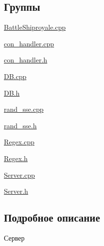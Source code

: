 \subsection*{Группы}
\begin{DoxyCompactItemize}
\item 
\mbox{\hyperlink{group__battleshiproyalecpp}{Battle\+Shiproyale.\+cpp}}
\item 
\mbox{\hyperlink{group__con__handler__cpp}{con\+\_\+handler.\+cpp}}
\item 
\mbox{\hyperlink{group__con__handler__h}{con\+\_\+handler.\+h}}
\item 
\mbox{\hyperlink{group__dbcpp}{D\+B.\+cpp}}
\item 
\mbox{\hyperlink{group__dbh}{D\+B.\+h}}
\item 
\mbox{\hyperlink{group__rand__ssecpp}{rand\+\_\+sse.\+cpp}}
\item 
\mbox{\hyperlink{group__rand__sseh}{rand\+\_\+sse.\+h}}
\item 
\mbox{\hyperlink{group__regexcpp}{Regex.\+cpp}}
\item 
\mbox{\hyperlink{group__regexh}{Regex.\+h}}
\item 
\mbox{\hyperlink{group__servercpp}{Server.\+cpp}}
\item 
\mbox{\hyperlink{group__serverh}{Server.\+h}}
\end{DoxyCompactItemize}


\subsection{Подробное описание}
Сервер 

